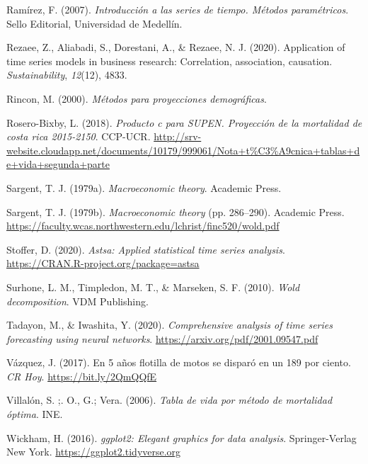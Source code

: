 \documentclass[
]{article}
\newlength{\cslhangindent}
\newlength{\cslentryspacingunit} %
\newenvironment{CSLReferences}[2] %
 {%
  \setlength{\parindent}{0pt}
  \ifodd #1
  \let\oldpar\par
  \def\par{\hangindent=\cslhangindent\oldpar}
  \fi
  \setlength{\parskip}{#2\cslentryspacingunit}
 }%
 {}
\begin{document}
\begin{CSLReferences}{1}{0}
\leavevmode{}%
Ramírez, F. (2007). \emph{Introducción a las series de tiempo. Métodos
paramétricos}. Sello Editorial, Universidad de Medellín.

\leavevmode{}%
Rezaee, Z., Aliabadi, S., Dorestani, A., \& Rezaee, N. J. (2020).
Application of time series models in business research: Correlation,
association, causation. \emph{Sustainability}, \emph{12}(12), 4833.

\leavevmode{}%
Rincon, M. (2000). \emph{Métodos para proyecciones demográficas}.

\leavevmode{}%
Rosero-Bixby, L. (2018). \emph{Producto c para SUPEN. Proyección de la
mortalidad de costa rica 2015-2150}. CCP-UCR.
\url{http://srv-website.cloudapp.net/documents/10179/999061/Nota+t\%C3\%A9cnica+tablas+de+vida+segunda+parte}

\leavevmode{}%
Sargent, T. J. (1979a). \emph{Macroeconomic theory}. Academic Press.

\leavevmode{}%
Sargent, T. J. (1979b). \emph{Macroeconomic theory} (pp. 286--290).
Academic Press.
\url{https://faculty.wcas.northwestern.edu/lchrist/finc520/wold.pdf}

\leavevmode{}%
Stoffer, D. (2020). \emph{Astsa: Applied statistical time series
analysis}. \url{https://CRAN.R-project.org/package=astsa}

\leavevmode{}%
Surhone, L. M., Timpledon, M. T., \& Marseken, S. F. (2010). \emph{Wold
decomposition}. VDM Publishing.

\leavevmode{}%
Tadayon, M., \& Iwashita, Y. (2020). \emph{Comprehensive analysis of
time series forecasting using neural networks}.
\url{https://arxiv.org/pdf/2001.09547.pdf}

\leavevmode{}%
Vázquez, J. (2017). En 5 años flotilla de motos se disparó en un 189 por
ciento. \emph{CR Hoy}. \url{https://bit.ly/2QmQQfE}

\leavevmode{}%
Villalón, S. ;. O., G.; Vera. (2006). \emph{Tabla de vida por método de
mortalidad óptima}. INE.

\leavevmode{}%
Wickham, H. (2016). \emph{ggplot2: Elegant graphics for data analysis}.
Springer-Verlag New York. \url{https://ggplot2.tidyverse.org}


\end{CSLReferences}
\end{document}
